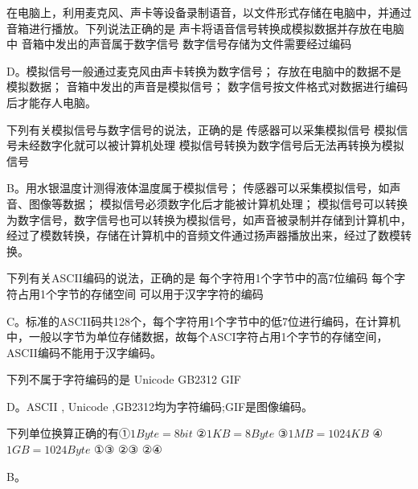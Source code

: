 \begin{groups}


\begin{questions}[rp]

\question
{}在电脑上，利用麦克风、声卡等设备录制语音，以文件形式存储在电脑中，并通过音箱进行播放。下列说法正确的是
{声卡将语音信号转换成模拟数据并存放在电脑中}
{音箱中发出的声音属于数字信号}
{数字信号存储为文件需要经过编码}
\begin{solution}
D。模拟信号一般通过麦克风由声卡转换为数字信号；
存放在电脑中的数据不是模拟数据；
音箱中发出的声音是模拟信号；
数字信号按文件格式对数据进行编码后才能存人电脑。
\end{solution}

\question
{}下列有关模拟信号与数字信号的说法，正确的是
{传感器可以采集模拟信号}
{模拟信号未经数字化就可以被计算机处理}
{模拟信号转换为数字信号后无法再转换为模拟信号}
\begin{solution}
B。用水银温度计测得液体温度属于模拟信号；
传感器可以采集模拟信号，如声音、图像等数据；
模拟信号必须数字化后才能被计算机处理；
模拟信号可以转换为数字信号，数字信号也可以转换为模拟信号，如声音被录制并存储到计算机中，经过了模数转换，存储在计算机中的音频文件通过扬声器播放出来，经过了数模转换。
\end{solution}

\question
{}下列有关ASCII编码的说法，正确的是
{每个字符用1个字节中的高7位编码}
{每个字符占用1个字节的存储空间}
{可以用于汉字字符的编码}
\begin{solution}
C。标准的ASCII码共128个，每个字符用1个字节中的低7位进行编码，在计算机中，一般以字节为单位存储数据，故每个ASCI字符占用1个字节的存储空间，ASCII编码不能用于汉字编码。
\end{solution}

\question
{}下列不属于字符编码的是
{Unicode}
{GB2312}
{GIF}
\begin{solution}
D。ASCII , Unicode ,GB2312均为字符编码;GIF是图像编码。
\end{solution}

\question
{}下列单位换算正确的有①$1Byte=8bit$ ②$1KB=8Byte$ ③$1MB=1024KB$ ④$1GB=1024Byte$
{①③}
{②③}
{②④}
\begin{solution}
B。
\end{solution}


\end{questions}
\end{groups}
